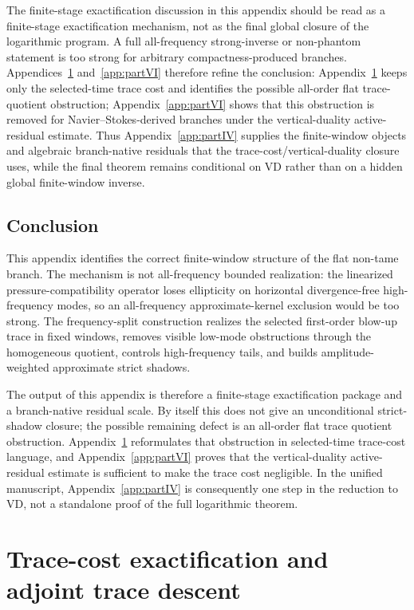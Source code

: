 \documentclass[11pt]{article}
\numberwithin{equation}{section}
\theoremstyle{plain}
\theoremstyle{definition}
\theoremstyle{remark}
\begin{document}
The finite-stage exactification discussion in this appendix should be read as a finite-stage exactification mechanism, not as the final global closure of the logarithmic program.  A full all-frequency strong-inverse or non-phantom statement is too strong for arbitrary compactness-produced branches.  Appendices~\ref{app:partV} and~\ref{app:partVI} therefore refine the conclusion: Appendix~\ref{app:partV} keeps only the selected-time trace cost and identifies the possible all-order flat trace-quotient obstruction; Appendix~\ref{app:partVI} shows that this obstruction is removed for Navier--Stokes-derived branches under the vertical-duality active-residual estimate.  Thus Appendix~\ref{app:partIV} supplies the finite-window objects and algebraic branch-native residuals that the trace-cost/vertical-duality closure uses, while the final theorem remains conditional on VD rather than on a hidden global finite-window inverse.

\subsection{Conclusion}

This appendix identifies the correct finite-window structure of the flat non-tame branch.  The mechanism is not all-frequency bounded realization: the linearized pressure-compatibility operator loses ellipticity on horizontal divergence-free high-frequency modes, so an all-frequency approximate-kernel exclusion would be too strong.  The frequency-split construction realizes the selected first-order blow-up trace in fixed windows, removes visible low-mode obstructions through the homogeneous quotient, controls high-frequency tails, and builds amplitude-weighted approximate strict shadows.

The output of this appendix is therefore a finite-stage exactification package and a branch-native residual scale.  By itself this does not give an unconditional strict-shadow closure; the possible remaining defect is an all-order flat trace quotient obstruction.  Appendix~\ref{app:partV} reformulates that obstruction in selected-time trace-cost language, and Appendix~\ref{app:partVI} proves that the vertical-duality active-residual estimate is sufficient to make the trace cost negligible.  In the unified manuscript, Appendix~\ref{app:partIV} is consequently one step in the reduction to VD, not a standalone proof of the full logarithmic theorem.

\section{Trace-cost exactification and adjoint trace descent}\label{app:partV}
\end{document}
